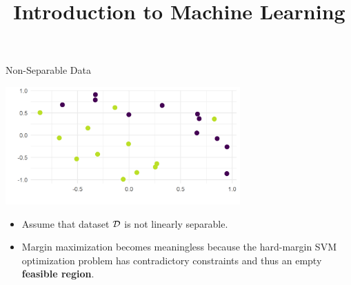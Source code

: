 \documentclass[11pt,compress,t,notes=noshow, xcolor=table]{beamer}
\title{Introduction to Machine Learning}
\date{}
\begin{document}

\sloppy 

\begin{vbframe}{Non-Separable Data}

\vspace{0.1cm}
\begin{center}
\includegraphics[width = 9cm ]{figure/non_separable_data.png} \\
\end{center}


\begin{itemize}
    \item Assume that dataset $\mathcal{D}$ is not linearly separable.
    \item Margin maximization becomes meaningless because the
    hard-margin SVM optimization problem has contradictory
    constraints and thus an empty \textbf{feasible region}.
\end{itemize}
\end{vbframe}
\end{document}
